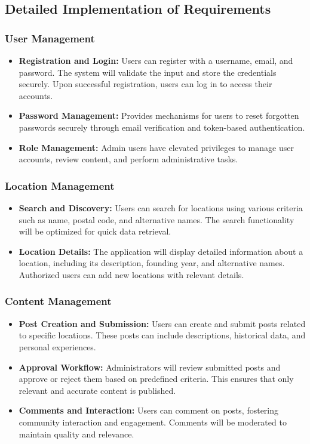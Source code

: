 \subsection{Detailed Implementation of Requirements}

\subsubsection{User Management}
\begin{itemize}
    \item \textbf{Registration and Login:} Users can register with a username, email, and password. The system will validate the input and store the credentials securely. Upon successful registration, users can log in to access their accounts.
    \item \textbf{Password Management:} Provides mechanisms for users to reset forgotten passwords securely through email verification and token-based authentication.
    \item \textbf{Role Management:} Admin users have elevated privileges to manage user accounts, review content, and perform administrative tasks.
\end{itemize}

\subsubsection{Location Management}
\begin{itemize}
    \item \textbf{Search and Discovery:} Users can search for locations using various criteria such as name, postal code, and alternative names. The search functionality will be optimized for quick data retrieval.
    \item \textbf{Location Details:} The application will display detailed information about a location, including its description, founding year, and alternative names. Authorized users can add new locations with relevant details.
\end{itemize}

\subsubsection{Content Management}
\begin{itemize}
    \item \textbf{Post Creation and Submission:} Users can create and submit posts related to specific locations. These posts can include descriptions, historical data, and personal experiences.
    \item \textbf{Approval Workflow:} Administrators will review submitted posts and approve or reject them based on predefined criteria. This ensures that only relevant and accurate content is published.
    \item \textbf{Comments and Interaction:} Users can comment on posts, fostering community interaction and engagement. Comments will be moderated to maintain quality and relevance.
\end{itemize}

